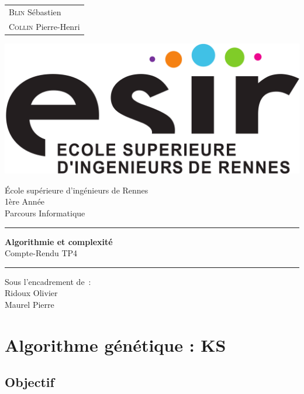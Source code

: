 \documentclass{article}
\begin{document}
\begin{titlepage}
	\vspace{-20px}
	\begin{tabular}{l}
		\textsc{Blin} S\'ebastien\\
		\textsc{Collin} Pierre-Henri
	\end{tabular}
	\hfill \vspace{10px}\includegraphics[scale=0.1]{esir.png}\\
	\vfill
	\begin{center}
		\Huge{\'Ecole sup\'erieure d'ing\'enieurs de Rennes}\\
		\vspace{1cm}
		\LARGE{1\`ere Ann\'ee}\\
		\large{Parcours Informatique}\\
		\vspace{0.5cm}\hrule\vspace{0.5cm}
		\LARGE{\textbf{Algorithmie et complexité}}\\
		\Large{Compte-Rendu TP4}
		\vspace{0.5cm}\hrule
		\vfill
		\vfill
	\end{center}
	\begin{flushleft}
		\Large{Sous l'encadrement de~:}\\
		\vspace{0.2cm}
		\large{{Ridoux} Olivier}\\
		\large{{Maurel} Pierre}
	\end{flushleft}
	\vfill
\end{titlepage}

\section{Algorithme génétique : KS}
\subsection{Objectif}
\end{document}
